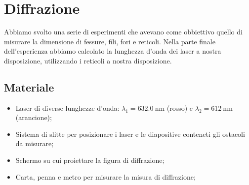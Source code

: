 \section{Diffrazione}

Abbiamo svolto una serie di esperimenti che avevano come obbiettivo quello di misurare la dimensione di fessure, fili,
fori e reticoli. Nella parte finale dell'esperienza abbiamo calcolato la lunghezza d'onda dei laser a nostra disposizione,
utilizzando i reticoli a nostra disposizione.

\subsection{Materiale}

\begin{itemize}
    \item{Laser di diverse lunghezze d'onda: $\lambda_1 = \SI{632.0}{\nano\metre}$ (rosso) e $\lambda_2 = \SI{612}{\nano\metre}$ (arancione);}
    \item{Sistema di slitte per posizionare i laser e le diapositive conteneti gli ostacoli da misurare;}
    \item{Schermo su cui proiettare la figura di diffrazione;}
    \item{Carta, penna e metro per misurare la misura di diffrazione;}
\end{itemize}
